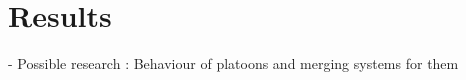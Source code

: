 \chapter{Results}
\label{cha:Results}
- Possible research : Behaviour of platoons and merging systems for them